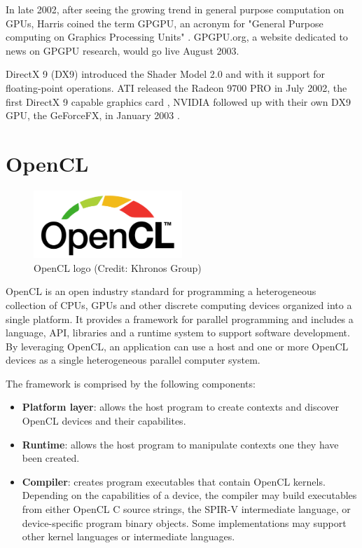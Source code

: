 In late 2002, after seeing the growing trend in general purpose computation on GPUs, Harris coined the term GPGPU, an acronym for "General Purpose computing on Graphics Processing Units" \cite{brief_history_gpgpu}. GPGPU.org, a website dedicated to news on GPGPU research, would go live August 2003.

DirectX 9 (DX9) introduced the Shader Model 2.0 and with it support for floating-point operations. ATI released the Radeon 9700 PRO in July 2002, the first DirectX 9 capable graphics card \cite{ati_9700_pro}, NVIDIA followed up with their own DX9 GPU, the GeForceFX, in January 2003 \cite{geforcefx}. \cite{photon_mapping_gpgpu}

\section{OpenCL}

\begin{figure}[h]
    \centering
    \includegraphics[width=0.5\textwidth]{img/opencl-logo.png}
    \captionsetup{justification=centering}
    \caption{OpenCL logo (Credit: Khronos Group)}
\end{figure}

OpenCL \cite{opencl_spec} is an open industry standard for programming a heterogeneous collection of CPUs, GPUs and other discrete computing devices organized into a single platform. It provides a framework for parallel programming and includes a language, API, libraries and a runtime system to support software development. By leveraging OpenCL, an application can use a host and one or more OpenCL devices as a single heterogeneous parallel computer system.

The framework is comprised by the following components:
\begin{itemize}
    \item \textbf{Platform layer}: allows the host program to create contexts and discover OpenCL devices and their capabilites.
    \item \textbf{Runtime}: allows the host program to manipulate contexts one they have been created.
    \item \textbf{Compiler}: creates program executables that contain OpenCL kernels. Depending on the capabilities of a device, the compiler may build executables from either OpenCL C source strings, the SPIR-V intermediate language, or device-specific program binary objects. Some implementations may support other kernel languages or intermediate languages.
\end{itemize}

